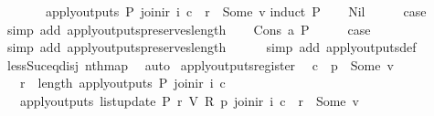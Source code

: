 \begin{isabellebody}
\ \ \ \ \ \ \ apply{\isacharunderscore}outputs\ P\ {\isacharparenleft}join{\isacharunderscore}ir\ i\ c{\isacharparenright}\ {\isacharbang}\ r\ {\isacharequal}\ Some\ v{\isachardoublequoteclose}\isanewline
%
\isadelimproof
%
\endisadelimproof
%
\isatagproof
{}\isamarkupfalse%
{\isacharparenleft}induct\ P{\isacharparenright}\isanewline
\ \ \isamarkupfalse%
\ Nil\isanewline
\ \ \isamarkupfalse%
\ \isamarkupfalse%
\ {\isacharquery}case\isanewline
\ \ \ \ \isamarkupfalse%
\ {\isacharparenleft}simp\ add{\isacharcolon}\ apply{\isacharunderscore}outputs{\isacharunderscore}preserves{\isacharunderscore}length{\isacharparenright}\isanewline
{}\isamarkupfalse%
\isanewline
\ \ \isamarkupfalse%
\ {\isacharparenleft}Cons\ a\ P{\isacharparenright}\isanewline
\ \ \isamarkupfalse%
\ \isamarkupfalse%
\ {\isacharquery}case\isanewline
\ \ \ \ \isamarkupfalse%
\ {\isacharparenleft}simp\ add{\isacharcolon}\ apply{\isacharunderscore}outputs{\isacharunderscore}preserves{\isacharunderscore}length{\isacharparenright}\isanewline
\ \ \ \ \isamarkupfalse%
\ {\isacharparenleft}simp\ add{\isacharcolon}\ apply{\isacharunderscore}outputs{\isacharunderscore}def{\isacharparenright}\isanewline
\ \ \ \ \isamarkupfalse%
\ less{\isacharunderscore}Suc{\isacharunderscore}eq{\isacharunderscore}{}{\isacharunderscore}disj\ nth{\isacharunderscore}map\ \isamarkupfalse%
\ auto\isanewline
{}\isamarkupfalse%
%
\endisatagproof
{\isafoldproof}%
%
\isadelimproof
\isanewline
%
\endisadelimproof
\isanewline
{}\isamarkupfalse%
\ apply{\isacharunderscore}outputs{\isacharunderscore}register{\isacharcolon}\isanewline
\ \ {\isachardoublequoteopen}c\ {\isachardollar}\ p\ {\isacharequal}\ Some\ v\ {\isasymLongrightarrow}\isanewline
\ \ \ r\ {\isacharless}\ length\ {\isacharparenleft}apply{\isacharunderscore}outputs\ P\ {\isacharparenleft}join{\isacharunderscore}ir\ i\ c{\isacharparenright}{\isacharparenright}\ {\isasymLongrightarrow}\isanewline
\ \ \ apply{\isacharunderscore}outputs\ {\isacharparenleft}list{\isacharunderscore}update\ P\ r\ {\isacharparenleft}V\ {\isacharparenleft}R\ p{\isacharparenright}{\isacharparenright}{\isacharparenright}\ {\isacharparenleft}join{\isacharunderscore}ir\ i\ c{\isacharparenright}\ {\isacharbang}\ r\ {\isacharequal}\ Some\ v{\isachardoublequoteclose}\isanewline
%
\isadelimproof
%
\endisadelimproof
%
\isatagproof
{}\isamarkupfalse%

\end{isabellebody}
